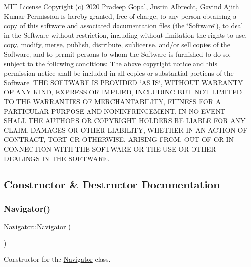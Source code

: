 M\+IT License Copyright (c) 2020 Pradeep Gopal, Justin Albrecht, Govind Ajith Kumar Permission is hereby granted, free of charge, to any person obtaining a copy of this software and associated documentation files (the \char`\"{}\+Software\char`\"{}), to deal in the Software without restriction, including without limitation the rights to use, copy, modify, merge, publish, distribute, sublicense, and/or sell copies of the Software, and to permit persons to whom the Software is furnished to do so, subject to the following conditions\+: The above copyright notice and this permission notice shall be included in all copies or substantial portions of the Software. T\+HE S\+O\+F\+T\+W\+A\+RE IS P\+R\+O\+V\+I\+D\+ED \char`\"{}\+A\+S I\+S\char`\"{}, W\+I\+T\+H\+O\+UT W\+A\+R\+R\+A\+N\+TY OF A\+NY K\+I\+ND, E\+X\+P\+R\+E\+SS OR I\+M\+P\+L\+I\+ED, I\+N\+C\+L\+U\+D\+I\+NG B\+UT N\+OT L\+I\+M\+I\+T\+ED TO T\+HE W\+A\+R\+R\+A\+N\+T\+I\+ES OF M\+E\+R\+C\+H\+A\+N\+T\+A\+B\+I\+L\+I\+TY, F\+I\+T\+N\+E\+SS F\+OR A P\+A\+R\+T\+I\+C\+U\+L\+AR P\+U\+R\+P\+O\+SE A\+ND N\+O\+N\+I\+N\+F\+R\+I\+N\+G\+E\+M\+E\+NT. IN NO E\+V\+E\+NT S\+H\+A\+LL T\+HE A\+U\+T\+H\+O\+RS OR C\+O\+P\+Y\+R\+I\+G\+HT H\+O\+L\+D\+E\+RS BE L\+I\+A\+B\+LE F\+OR A\+NY C\+L\+A\+IM, D\+A\+M\+A\+G\+ES OR O\+T\+H\+ER L\+I\+A\+B\+I\+L\+I\+TY, W\+H\+E\+T\+H\+ER IN AN A\+C\+T\+I\+ON OF C\+O\+N\+T\+R\+A\+CT, T\+O\+RT OR O\+T\+H\+E\+R\+W\+I\+SE, A\+R\+I\+S\+I\+NG F\+R\+OM, O\+UT OF OR IN C\+O\+N\+N\+E\+C\+T\+I\+ON W\+I\+TH T\+HE S\+O\+F\+T\+W\+A\+RE OR T\+HE U\+SE OR O\+T\+H\+ER D\+E\+A\+L\+I\+N\+GS IN T\+HE S\+O\+F\+T\+W\+A\+RE. 

\subsection{Constructor \& Destructor Documentation}
\mbox{\label{class_navigator_a59230ab4698882f754d5ce275a1a4030}} 
\subsubsection{\texorpdfstring{Navigator()}{Navigator()}}
{\footnotesize\ttfamily Navigator\+::\+Navigator (\begin{DoxyParamCaption}{ }\end{DoxyParamCaption})}



Constructor for the \hyperlink{class_navigator}{Navigator} class. 

